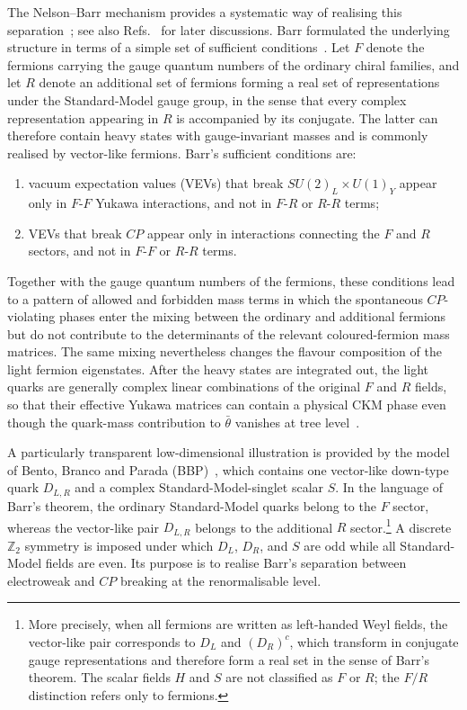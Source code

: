 \documentclass[review]{elsarticle}
\numberwithin{equation}{section}
\numberwithin{table}{section}
\numberwithin{figure}{section}
\begin{document}
The Nelson--Barr mechanism provides a systematic way of realising this separation~\cite{Nelson:1983zb,Barr:1984qx,Barr:1984fh}; see also Refs.~\cite{Cheng:1987gp,Dine:2015jga,Vecchi:2014hpa,Valenti:2021xjp} for later discussions. Barr formulated the underlying structure in terms of a simple set of sufficient conditions~\cite{Barr:1984qx}. Let $F$ denote the fermions carrying the gauge quantum numbers of the ordinary chiral families, and let $R$ denote an additional set of fermions forming a real set of representations under the Standard-Model gauge group, in the sense that every complex representation appearing in $R$ is accompanied by its conjugate. The latter can therefore contain heavy states with gauge-invariant masses and is commonly realised by vector-like fermions. Barr's sufficient conditions are:
\begin{enumerate}
    \item[(1)] vacuum expectation values (VEVs) that break $SU(2)_L\times U(1)_Y$ appear only in $F$-$F$ Yukawa interactions, and not in $F$-$R$ or $R$-$R$ terms;
    \item[(2)] VEVs that break $CP$ appear only in interactions connecting the $F$ and $R$ sectors, and not in $F$-$F$ or $R$-$R$ terms.
\end{enumerate}
Together with the gauge quantum numbers of the fermions, these conditions lead to a pattern of allowed and forbidden mass terms in which the spontaneous $CP$-violating phases enter the mixing between the ordinary and additional fermions but do not contribute to the determinants of the relevant coloured-fermion mass matrices. The same mixing nevertheless changes the flavour composition of the light fermion eigenstates. After the heavy states are integrated out, the light quarks are generally complex linear combinations of the original $F$ and $R$ fields, so that their effective Yukawa matrices can contain a physical CKM phase even though the quark-mass contribution to $\bar\theta$ vanishes at tree level~\cite{Nelson:1983zb,Barr:1984qx}.

A particularly transparent low-dimensional illustration is provided by the model of Bento, Branco and Parada (BBP)~\cite{Bento:1991ez}, which contains one vector-like down-type quark $D_{L,R}$ and a complex Standard-Model-singlet scalar $S$. In the language of Barr's theorem, the ordinary Standard-Model quarks belong to the $F$ sector, whereas the vector-like pair $D_{L,R}$ belongs to the additional $R$ sector.\footnote{More precisely, when all fermions are written as left-handed Weyl fields, the vector-like pair corresponds to $D_L$ and $(D_R)^c$, which transform in conjugate gauge representations and therefore form a real set in the sense of Barr's theorem. The scalar fields $H$ and $S$ are not classified as $F$ or $R$; the $F/R$ distinction refers only to fermions.} A discrete $\mathbb{Z}_2$ symmetry is imposed under which $D_L$, $D_R$, and $S$ are odd while all Standard-Model fields are even. Its purpose is to realise Barr's separation between electroweak and $CP$ breaking at the renormalisable level.
\end{document}
